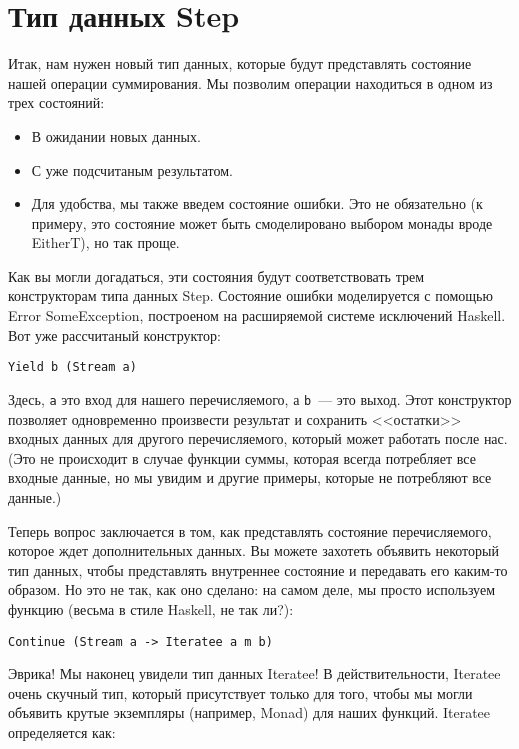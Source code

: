 \section{Тип данных Step}

Итак, нам нужен новый тип данных, которые будут представлять состояние нашей операции суммирования. Мы позволим операции находиться в одном из трех состояний:

\begin{itemize}
\item В ожидании новых данных.
\item С уже подсчитаным результатом.
\item Для удобства, мы также введем состояние ошибки. Это не обязательно (к примеру, это состояние может быть смоделировано выбором монады вроде EitherT), но так проще.
\end{itemize}

Как вы могли догадаться, эти состояния будут соответствовать трем конструкторам типа данных Step. Состояние ошибки моделируется с помощью Error SomeException, построеном на расширяемой системе исключений Haskell. Вот уже рассчитаный конструктор:

\begin{lstlisting}
Yield b (Stream a)
\end{lstlisting}

Здесь, \lstinline'a' это вход для нашего перечисляемого, а \lstinline'b'~--- это выход. Этот конструктор позволяет одновременно произвести результат и сохранить <<остатки>> входных данных для другого перечисляемого, который может работать после нас. (Это не происходит в случае функции суммы, которая всегда потребляет все входные данные, но мы увидим и другие примеры, которые не потребляют все данные.)

Теперь вопрос заключается в том, как представлять состояние перечисляемого, которое ждет дополнительных данных. Вы можете захотеть объявить некоторый тип данных, чтобы представлять внутреннее состояние и передавать его каким-то образом. Но это не так, как оно сделано: на самом деле, мы просто используем функцию (весьма в стиле Haskell, не так ли?):

\begin{lstlisting}
Continue (Stream a -> Iteratee a m b)
\end{lstlisting}

Эврика! Мы наконец увидели тип данных Iteratee! В действительности, Iteratee очень скучный тип, который присутствует только для того, чтобы мы могли объявить крутые экземпляры (например, Monad) для наших функций. Iteratee определяется как:

